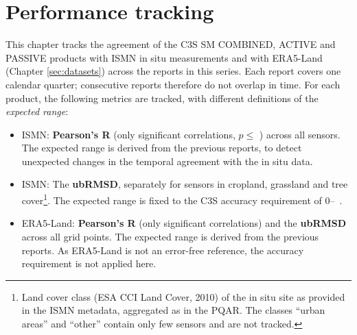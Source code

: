 
\section{Performance tracking} \label{sec:tracking}

\noindent This chapter tracks the agreement of the \ac{C3S} SM COMBINED, ACTIVE and PASSIVE products with \ac{ISMN} in situ measurements and with ERA5-Land (Chapter \ref{sec:datasets}) across the reports in this series.
Each report covers one calendar quarter; consecutive reports therefore do not overlap in time.
For each product, the following metrics are tracked, with different definitions of the \textit{expected range}:

\begin{itemize}
    \item \ac{ISMN}: \textbf{Pearson's R} (only significant correlations, $p \leq$ ) across all sensors. The expected range is derived from the previous reports, to detect unexpected changes in the temporal agreement with the in situ data.
    \item \ac{ISMN}: The \textbf{\ac{ubRMSD}}, separately for sensors in cropland, grassland and tree cover\footnote{Land cover class (\ac{ESA} \ac{CCI} Land Cover, 2010) of the in situ site as provided in the \ac{ISMN} metadata, aggregated as in the \ac{PQAR}. The classes ``urban areas'' and ``other'' contain only few sensors and are not tracked.}. The expected range is fixed to the \ac{C3S} accuracy requirement of 0--\kpithres{}~\unitsm{}.
    \item ERA5-Land: \textbf{Pearson's R} (only significant correlations) and the \textbf{\ac{ubRMSD}} across all grid points. The expected range is derived from the previous reports. As ERA5-Land is not an error-free reference, the accuracy requirement is not applied here.
\end{itemize}

